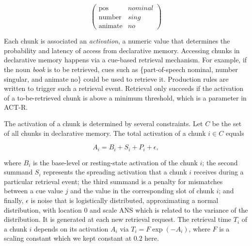 \documentclass[10pt,letterpaper]{article}
\begin{document}
\begin{equation*}
\begin{pmatrix}
  \text{pos} & \mathit{nominal} \\
  \text{number} & \mathit{sing} \\
  \text{animate} & \mathit{no}
\end{pmatrix}
\end{equation*}

 Each chunk is associated an \emph{activation}, a numeric value that determines the probability and latency of access from declarative memory. Accessing chunks in declarative memory happens via a cue-based retrieval mechanism. For example, if the noun \textit{book} is to be retrieved, cues such as \{part-of-speech nominal, number singular, and animate no\} could be used to retrieve it.  Production rules are written to trigger such a retrieval event. Retrieval only succeeds if the activation of a to-be-retrieved chunk is above a minimum threshold, which is a parameter in ACT-R.

The activation of a chunk is determined by several constraints. 
Let $C$ be the set of all chunks in declarative memory. The total activation of a chunk $i \in C$ equals

\begin{equation}\label{eq:1}
A_i = B_i + S_i + P_i + \epsilon,
\end{equation}

\noindent
where $B_i$ is the base-level or resting-state activation of the chunk $i$; the second summand $S_i$ represents the spreading activation that a chunk $i$ receives during a particular retrieval event; the third summand is a penalty for mismatches between a cue value $j$ and the value in the corresponding slot of chunk $i$; and finally, $\epsilon$ is noise that is logistically distributed, approximating a normal distribution, with location $0$ and scale ANS which is related to the variance of the distribution. It is generated at each new retrieval request.
The retrieval time $T_i$ of a chunk $i$ depends on its activation $A_i$ via $T_i = F \exp(-A_i)$, where $F$ is a scaling constant which we kept constant at $0.2$ here.
\end{document}
